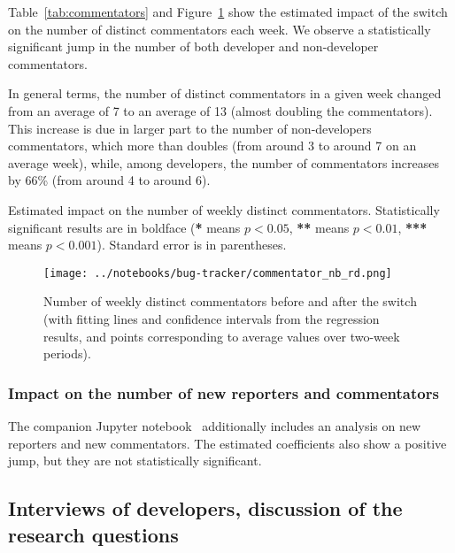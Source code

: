 Table~\ref{tab:commentators} and Figure~\ref{commentator_nb_rd} show the estimated impact of the switch on the number of distinct commentators each week.
We observe a statistically significant jump in the number of both developer and non-developer commentators. 

In general terms, the number of distinct commentators in a given week changed from an average of 7 to an average of 13 (almost doubling the commentators).
This increase is due in larger part to the number of non-developers commentators, which more than doubles (from around 3 to around 7 on an average week), while, among developers, the number of commentators  increases by 66\% (from around 4 to around 6).

\begin{table}
	\begin{center}
		
		\caption{
			Estimated impact on the number of weekly distinct commentators.
			Statistically significant results are in boldface (\textbf{*} means $p<0.05$, \textbf{**} means $p<0.01$, \textbf{***} means $p<0.001$).
			Standard error is in parentheses.
		}
		\label{tab:commentators}
	\end{center}
\end{table}


\begin{figure}
	\begin{center}
		\texttt{[image: ../notebooks/bug-tracker/commentator\_nb\_rd.png]}
		\caption{Number of weekly distinct commentators before and after the switch (with fitting lines and confidence intervals from the regression results, and points corresponding to average values over two-week periods).} \label{commentator_nb_rd}
	\end{center}
\end{figure}

\subsubsection{Impact on the number of new reporters and commentators}

The companion Jupyter notebook~\cite{zimmermann2019bugtracker} additionally includes an analysis on new reporters and new commentators.
The estimated coefficients also show a positive jump, but they are not statistically significant.

\subsection{Interviews of developers, discussion of the research questions}

